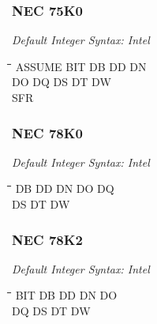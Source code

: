 \subsubsection{NEC 75K0}

{\em Default Integer Syntax: Intel}

{\tt\begin{tabbing}
\hspace{3cm}\=\hspace{3cm}\=\hspace{3cm}\=\hspace{3cm}\=\kill
ASSUME     \> BIT         \> DB          \> DD          \> DN \\
DO         \> DQ          \> DS          \> DT          \> DW \\
SFR \\
\end{tabbing}}

\subsubsection{NEC 78K0}

{\em Default Integer Syntax: Intel}

{\tt\begin{tabbing}
\hspace{3cm}\=\hspace{3cm}\=\hspace{3cm}\=\hspace{3cm}\=\kill
DB         \> DD          \> DN          \> DO          \> DQ \\
DS         \> DT          \> DW \\
\end{tabbing}}

\subsubsection{NEC 78K2}

{\em Default Integer Syntax: Intel}

{\tt\begin{tabbing}
\hspace{3cm}\=\hspace{3cm}\=\hspace{3cm}\=\hspace{3cm}\=\kill
BIT        \> DB         \> DD          \> DN          \> DO \\
DQ         \> DS         \> DT          \> DW \\
\end{tabbing}}

